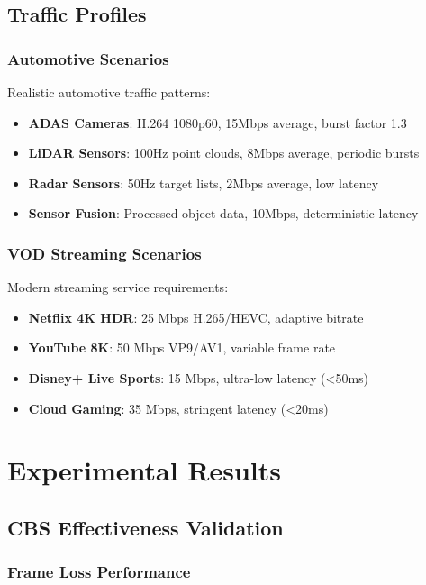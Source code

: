 \documentclass[10pt, journal, compsoc]{IEEEtran}
\begin{document}
\subsection{Traffic Profiles}

\subsubsection{Automotive Scenarios}

Realistic automotive traffic patterns:
\begin{itemize}
    \item \textbf{ADAS Cameras}: H.264 1080p60, 15Mbps average, burst factor 1.3
    \item \textbf{LiDAR Sensors}: 100Hz point clouds, 8Mbps average, periodic bursts
    \item \textbf{Radar Sensors}: 50Hz target lists, 2Mbps average, low latency
    \item \textbf{Sensor Fusion}: Processed object data, 10Mbps, deterministic latency
\end{itemize}

\subsubsection{VOD Streaming Scenarios}

Modern streaming service requirements:
\begin{itemize}
    \item \textbf{Netflix 4K HDR}: 25 Mbps H.265/HEVC, adaptive bitrate
    \item \textbf{YouTube 8K}: 50 Mbps VP9/AV1, variable frame rate
    \item \textbf{Disney+ Live Sports}: 15 Mbps, ultra-low latency (<50ms)
    \item \textbf{Cloud Gaming}: 35 Mbps, stringent latency (<20ms)
\end{itemize}

\section{Experimental Results}

\subsection{CBS Effectiveness Validation}

\subsubsection{Frame Loss Performance}
\end{document}
